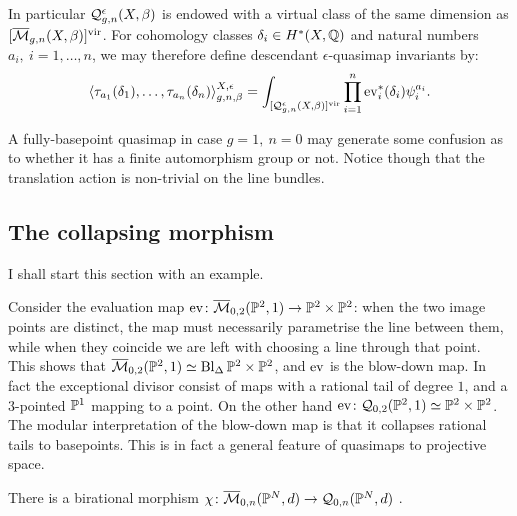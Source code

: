 In particular $\mathcal{Q}^{\epsilon}_{g,n}(X,\beta)$ is endowed with a virtual class of the same dimension as $[\overline{\mathcal{M}}_{g,n}(X,\beta)]^{\mathrm{vir}}$. For cohomology classes $\delta_i\in H^*(X,\mathbb{Q})$ and natural numbers $a_i,\ i=1,\ldots,n$, we may therefore define descendant $\epsilon$-quasimap invariants by:
\[\langle \tau_{a_1}(\delta_1),\ldots,\tau_{a_n}(\delta_n)\rangle^{X,\epsilon}_{g,n,\beta}=\int_{[\mathcal{Q}^{\epsilon}_{g,n}(X,\beta)]^{\mathrm{vir}}}\prod_{i=1}^n \operatorname{ev}_i^*(\delta_i)\psi_i^{a_i}.\]

\begin{rmk}
 A fully-basepoint quasimap in case $g=1,\ n=0$ may generate some confusion as to whether it has a finite automorphism group or not. Notice though that the translation action is non-trivial on the line bundles.
\end{rmk}

\subsection{The collapsing morphism}\label{sec:collapsing} I shall start this section with an example.
\begin{ex}\label{ex:lines_in_p2}
 Consider the evaluation map $\operatorname{ev}\colon \overline{\mathcal{M}}_{0,2}(\mathbb P^2,1)\rightarrow \mathbb P^2\times\mathbb P^2$: when the two image points are distinct, the map must necessarily parametrise the line between them, while when they coincide we are left with choosing a line through that point. This shows that $\overline{\mathcal{M}}_{0,2}(\mathbb P^2,1)\simeq \operatorname{Bl}_{\Delta}\mathbb P^2\times\mathbb P^2$, and $\operatorname{ev}$ is the blow-down map. In fact the exceptional divisor consist of maps with a rational tail of degree $1$, and a $3$-pointed $\mathbb P^1$ mapping to a point. On the other hand $\operatorname{ev}\colon \mathcal{Q}_{0,2}(\mathbb P^2,1)\simeq \mathbb P^2\times\mathbb P^2$. The modular interpretation of the blow-down map is that it collapses rational tails to basepoints. This is in fact a general feature of quasimaps to projective space.
\end{ex}

\begin{lem}
 There is a birational  morphism $\chi\colon \overline{\mathcal{M}}_{0,n}(\mathbb P^N,d)\rightarrow \mathcal{Q}_{0,n}(\mathbb P^N,d)$ .
\end{lem}


